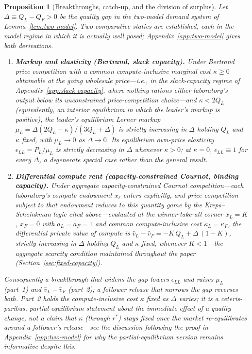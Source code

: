 \documentclass[11pt]{article}
\newtheorem{proposition}{Proposition}
\begin{document}
\begin{proposition}[Breakthroughs, catch-up, and the division of surplus]\label{prop:breakthrough}
Let $\Delta\equiv Q_L-Q_F>0$ be the quality gap in the two-model demand system of Lemma~\ref{lem:two-model}. Two comparative statics are established, each in the model regime in which it is actually well posed; Appendix~\ref{app:two-model} gives both derivations.
\begin{enumerate}
\item \textbf{Markup and elasticity (Bertrand, slack capacity).} Under Bertrand price competition with a common compute-inclusive marginal cost $\kappa\geq0$ obtainable at the going wholesale price---i.e., in the slack-capacity regime of Appendix~\ref{app:slack-capacity}, where nothing rations either laboratory's output below its unconstrained price-competition choice---and $\kappa<2Q_L$ (equivalently, an interior equilibrium in which the leader's markup is positive), the leader's equilibrium Lerner markup $\mu_L=\Delta(2Q_L-\kappa)/(3Q_L+\Delta)$ is strictly increasing in $\Delta$ holding $Q_L$ and $\kappa$ fixed, with $\mu_L\to0$ as $\Delta\to0$. Its equilibrium own-price elasticity $\epsilon_{LL}=P_L/\mu_L$ is strictly decreasing in $\Delta$ whenever $\kappa>0$; at $\kappa=0$, $\epsilon_{LL}\equiv1$ for every $\Delta$, a degenerate special case rather than the general result.
\item \textbf{Differential compute rent (capacity-constrained Cournot, binding capacity).} Under aggregate capacity-constrained Cournot competition---each laboratory's compute endowment $x_\ell$ enters explicitly, and price competition subject to that endowment reduces to this quantity game by the Kreps--Scheinkman logic cited above---evaluated at the winner-take-all corner $x_L=K$, $x_F=0$ with $a_L=a_F=1$ and common compute-inclusive cost $\kappa_L=\kappa_F$, the differential private value of compute is $\widehat v_L-\widehat v_F=-K\,Q_L+\Delta\,(1-K)$, strictly increasing in $\Delta$ holding $Q_L$ and $\kappa$ fixed, whenever $K<1$---the aggregate scarcity condition maintained throughout the paper (Section~\ref{sec:fixed-capacity}).
\end{enumerate}
Consequently a breakthrough that widens the gap lowers $\epsilon_{LL}$ and raises $\mu_L$ (part~1) and $\widehat v_L-\widehat v_F$ (part~2); a follower release that narrows the gap reverses both. Part~2 holds the compute-inclusive cost $\kappa$ fixed as $\Delta$ varies; it is a ceteris-paribus, partial-equilibrium statement about the immediate effect of a quality change, not a claim that $\kappa$ (through $r^*$) stays fixed once the market re-equilibrates around a follower's release---see the discussion following the proof in Appendix~\ref{app:two-model} for why the partial-equilibrium version remains informative despite this.
\end{proposition}
\end{document}
